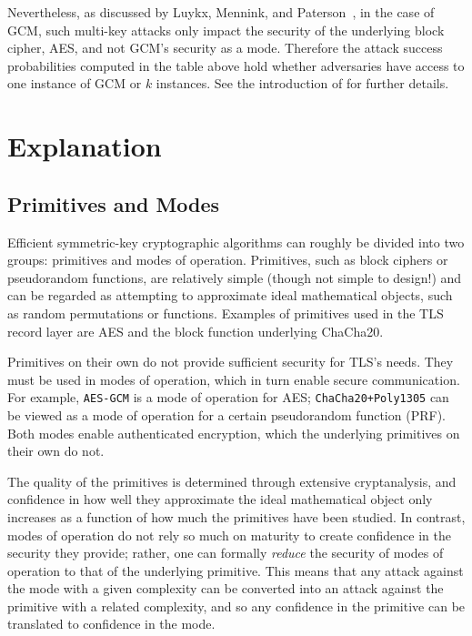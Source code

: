 \documentclass{article}
\begin{document}
Nevertheless, as discussed by Luykx, Mennink, and Paterson~\cite{DBLP:journals/iacr/LuykxMP17, DBLP:conf/asiacrypt/LuykxMP17}, in the case of GCM, such multi-key attacks only impact the security of the underlying block cipher, AES, and not GCM's security as a mode. Therefore the attack success probabilities computed in the table above hold whether adversaries have access to one instance of GCM or $k$ instances. See the introduction of \cite{DBLP:journals/iacr/LuykxMP17} for further details.




\section{Explanation}\label{sec:explanation}

\subsection{Primitives and Modes}
Efficient symmetric-key cryptographic algorithms can roughly be divided into two groups: primitives and modes of operation. Primitives, such as block ciphers or pseudorandom functions, are relatively simple (though not simple to design!) and can be regarded as attempting to approximate ideal mathematical objects, such as random permutations or functions. Examples of primitives used in the TLS record layer are AES and the block function underlying ChaCha20. 

Primitives on their own do not provide sufficient security for TLS's needs. They must be used in modes of operation, which in turn enable secure communication. For example, \texttt{AES-GCM} is a mode of operation for AES; \texttt{ChaCha20+Poly1305} can be viewed as a mode of operation for a certain pseudorandom function (PRF). Both modes enable authenticated encryption, which the underlying primitives on their own do not.

The quality of the primitives is determined through extensive cryptanalysis, and confidence in how well they approximate the ideal mathematical object only increases as a function of how much the primitives have been studied. In contrast, modes of operation do not rely so much on maturity to create confidence in the security they provide; rather, one can formally \emph{reduce} the security of modes of operation to that of the underlying primitive. This means that any attack against the mode with a given complexity can be converted into an attack against the primitive with a related complexity, and so any confidence in the primitive can be translated to confidence in the mode.
\end{document}

